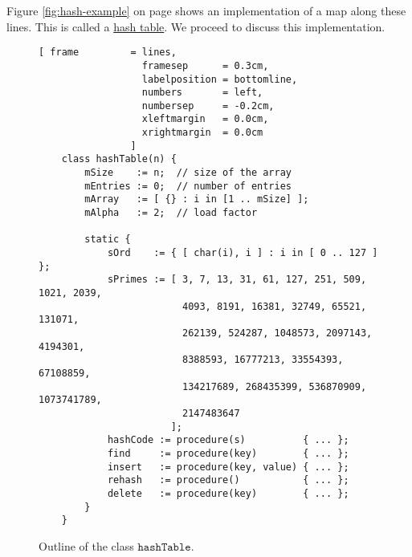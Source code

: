 Figure \ref{fig:hash-example} on page \pageref{fig:hash-example} shows an implementation of a map along these
lines.  This is called a \href{https://en.wikipedia.org/wiki/Hash_table}{hash table}.
We proceed to discuss this implementation.



\begin{figure}[!ht]
  \centering
\begin{Verbatim}[ frame         = lines, 
                  framesep      = 0.3cm, 
                  labelposition = bottomline,
                  numbers       = left,
                  numbersep     = -0.2cm,
                  xleftmargin   = 0.0cm,
                  xrightmargin  = 0.0cm
                ]
    class hashTable(n) {
        mSize    := n;  // size of the array 
        mEntries := 0;  // number of entries
        mArray   := [ {} : i in [1 .. mSize] ];
        mAlpha   := 2;  // load factor
    
        static {
            sOrd    := { [ char(i), i ] : i in [ 0 .. 127 ] };
            sPrimes := [ 3, 7, 13, 31, 61, 127, 251, 509, 1021, 2039, 
                         4093, 8191, 16381, 32749, 65521, 131071, 
                         262139, 524287, 1048573, 2097143, 4194301, 
                         8388593, 16777213, 33554393, 67108859, 
                         134217689, 268435399, 536870909, 1073741789, 
                         2147483647 
                       ];    
            hashCode := procedure(s)          { ... };
            find     := procedure(key)        { ... };
            insert   := procedure(key, value) { ... };
            rehash   := procedure()           { ... };
            delete   := procedure(key)        { ... };    
        }
    }
\end{Verbatim}
\vspace*{-0.3cm}
  \caption{Outline of the class $\mathtt{hashTable}$.}
  \label{fig:hashTable.stlx-outline}
\end{figure}

